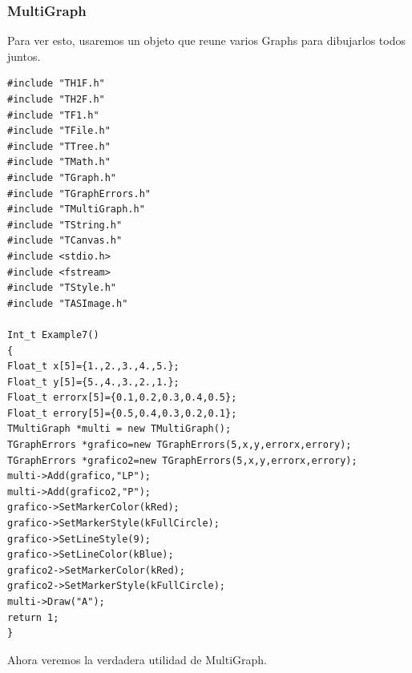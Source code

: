 \documentclass{article}
\begin{document}
\subsubsection{MultiGraph}
Para ver esto, usaremos un objeto que reune varios Graphs para dibujarlos todos juntos.
\begin{tcolorbox} [breakable]
\begin{verbatim}
#include "TH1F.h"
#include "TH2F.h"
#include "TF1.h"
#include "TFile.h"
#include "TTree.h"
#include "TMath.h"
#include "TGraph.h"
#include "TGraphErrors.h"
#include "TMultiGraph.h"
#include "TString.h"
#include "TCanvas.h"
#include <stdio.h>
#include <fstream>
#include "TStyle.h"
#include "TASImage.h"

Int_t Example7()
{
Float_t x[5]={1.,2.,3.,4.,5.};
Float_t y[5]={5.,4.,3.,2.,1.};
Float_t errorx[5]={0.1,0.2,0.3,0.4,0.5};
Float_t errory[5]={0.5,0.4,0.3,0.2,0.1};
TMultiGraph *multi = new TMultiGraph();
TGraphErrors *grafico=new TGraphErrors(5,x,y,errorx,errory);
TGraphErrors *grafico2=new TGraphErrors(5,x,y,errorx,errory);
multi->Add(grafico,"LP");
multi->Add(grafico2,"P");
grafico->SetMarkerColor(kRed);
grafico->SetMarkerStyle(kFullCircle);
grafico->SetLineStyle(9);
grafico->SetLineColor(kBlue);
grafico2->SetMarkerColor(kRed);
grafico2->SetMarkerStyle(kFullCircle);
multi->Draw("A");
return 1;
}
\end{verbatim}
\end{tcolorbox}

Ahora veremos la verdadera utilidad de MultiGraph.
\end{document}

